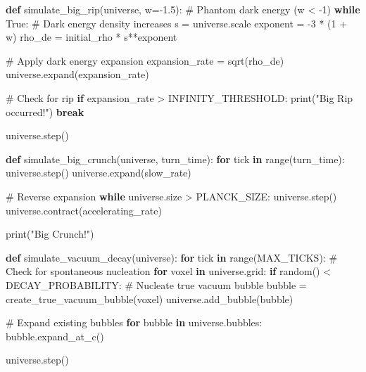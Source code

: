 \documentclass[
  11pt,
  letterpaper,
  twoside,
  openright]{book}
\newenvironment{Shaded}{\begin{snugshade}}{\end{snugshade}}
\newcommand{\BuiltInTok}[1]{\textcolor[rgb]{0.00,0.23,0.31}{#1}}
\newcommand{\CommentTok}[1]{\textcolor[rgb]{0.37,0.37,0.37}{#1}}
\newcommand{\ControlFlowTok}[1]{\textcolor[rgb]{0.00,0.23,0.31}{\textbf{#1}}}
\newcommand{\DecValTok}[1]{\textcolor[rgb]{0.68,0.00,0.00}{#1}}
\newcommand{\FloatTok}[1]{\textcolor[rgb]{0.68,0.00,0.00}{#1}}
\newcommand{\KeywordTok}[1]{\textcolor[rgb]{0.00,0.23,0.31}{\textbf{#1}}}
\newcommand{\NormalTok}[1]{\textcolor[rgb]{0.00,0.23,0.31}{#1}}
\newcommand{\OperatorTok}[1]{\textcolor[rgb]{0.37,0.37,0.37}{#1}}
\newcommand{\StringTok}[1]{\textcolor[rgb]{0.13,0.47,0.30}{#1}}
\newcommand{\VariableTok}[1]{\textcolor[rgb]{0.07,0.07,0.07}{#1}}
\begin{document}
\begin{Shaded}
\begin{Highlighting}[]
\KeywordTok{def}\NormalTok{ simulate\_big\_rip(universe, w}\OperatorTok{={-}}\FloatTok{1.5}\NormalTok{):}
    \CommentTok{\# Phantom dark energy (w \textless{} {-}1)}
    \ControlFlowTok{while} \VariableTok{True}\NormalTok{:}
        \CommentTok{\# Dark energy density increases}
\NormalTok{        s }\OperatorTok{=}\NormalTok{ universe.scale}
\NormalTok{        exponent }\OperatorTok{=} \OperatorTok{{-}}\DecValTok{3} \OperatorTok{*}\NormalTok{ (}\DecValTok{1} \OperatorTok{+}\NormalTok{ w)}
\NormalTok{        rho\_de }\OperatorTok{=}\NormalTok{ initial\_rho }\OperatorTok{*}\NormalTok{ s}\OperatorTok{**}\NormalTok{exponent}

        \CommentTok{\# Apply dark energy expansion}
\NormalTok{        expansion\_rate }\OperatorTok{=}\NormalTok{ sqrt(rho\_de)}
\NormalTok{        universe.expand(expansion\_rate)}

        \CommentTok{\# Check for rip}
        \ControlFlowTok{if}\NormalTok{ expansion\_rate }\OperatorTok{\textgreater{}}\NormalTok{ INFINITY\_THRESHOLD:}
            \BuiltInTok{print}\NormalTok{(}\StringTok{"Big Rip occurred!"}\NormalTok{)}
            \ControlFlowTok{break}

\NormalTok{        universe.step()}

\KeywordTok{def}\NormalTok{ simulate\_big\_crunch(universe, turn\_time):}
    \ControlFlowTok{for}\NormalTok{ tick }\KeywordTok{in} \BuiltInTok{range}\NormalTok{(turn\_time):}
\NormalTok{        universe.step()}
\NormalTok{        universe.expand(slow\_rate)}

    \CommentTok{\# Reverse expansion}
    \ControlFlowTok{while}\NormalTok{ universe.size }\OperatorTok{\textgreater{}}\NormalTok{ PLANCK\_SIZE:}
\NormalTok{        universe.step()}
\NormalTok{        universe.contract(accelerating\_rate)}

    \BuiltInTok{print}\NormalTok{(}\StringTok{"Big Crunch!"}\NormalTok{)}

\KeywordTok{def}\NormalTok{ simulate\_vacuum\_decay(universe):}
    \ControlFlowTok{for}\NormalTok{ tick }\KeywordTok{in} \BuiltInTok{range}\NormalTok{(MAX\_TICKS):}
        \CommentTok{\# Check for spontaneous nucleation}
        \ControlFlowTok{for}\NormalTok{ voxel }\KeywordTok{in}\NormalTok{ universe.grid:}
            \ControlFlowTok{if}\NormalTok{ random() }\OperatorTok{\textless{}}\NormalTok{ DECAY\_PROBABILITY:}
                \CommentTok{\# Nucleate true vacuum bubble}
\NormalTok{                bubble }\OperatorTok{=}\NormalTok{ create\_true\_vacuum\_bubble(voxel)}
\NormalTok{                universe.add\_bubble(bubble)}

        \CommentTok{\# Expand existing bubbles}
        \ControlFlowTok{for}\NormalTok{ bubble }\KeywordTok{in}\NormalTok{ universe.bubbles:}
\NormalTok{            bubble.expand\_at\_c()}

\NormalTok{        universe.step()}
\end{Highlighting}
\end{Shaded}
\end{document}

